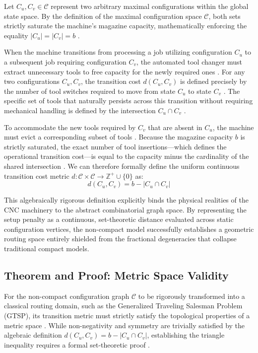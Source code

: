 \documentclass[11pt, a4paper]{book}
\begin{document}
	Let $C_u, C_v \in \mathcal{C}$ represent two arbitrary maximal configurations within the global state space. By the definition of the maximal configuration space $\mathcal{C}$, both sets strictly saturate the machine's magazine capacity, mathematically enforcing the equality $|C_u| = |C_v| = b$ \cite{Colares2026}. %
	
	When the machine transitions from processing a job utilizing configuration $C_u$ to a subsequent job requiring configuration $C_v$, the automated tool changer must extract unnecessary tools to free capacity for the newly required ones \cite{Colares2026}. %
	For any two configurations $C_u, C_v$, the transition cost $d(C_u, C_v)$ is defined precisely by the number of tool switches required to move from state $C_u$ to state $C_v$ \cite{Colares2026}. %
	The specific set of tools that naturally persists across this transition without requiring mechanical handling is defined by the intersection $C_u \cap C_v$ \cite{Colares2026}. %
	
	To accommodate the new tools required by $C_v$ that are absent in $C_u$, the machine must evict a corresponding subset of tools \cite{Colares2026}. %
	Because the magazine capacity $b$ is strictly saturated, the exact number of tool insertions—which defines the operational transition cost—is equal to the capacity minus the cardinality of the shared intersection \cite{Colares2026}. %
	We can therefore formally define the uniform continuous transition cost metric $d: \mathcal{C} \times \mathcal{C} \to \mathbb{Z}^+ \cup \{0\}$ as:
	\begin{equation}
		d(C_u, C_v) = b - |C_u \cap C_v| \label{eq:transition_metric}
	\end{equation}
	
	This algebraically rigorous definition explicitly binds the physical realities of the CNC machinery to the abstract combinatorial graph space. By representing the setup penalty as a continuous, set-theoretic distance evaluated across static configuration vertices, the non-compact model successfully establishes a geometric routing space entirely shielded from the fractional degeneracies that collapse traditional compact models.
	
	\subsection{Theorem and Proof: Metric Space Validity}
	
	For the non-compact configuration graph $\mathcal{C}$ to be rigorously transformed into a classical routing domain, such as the Generalized Traveling Salesman Problem (GTSP), its transition metric must strictly satisfy the topological properties of a metric space \cite{Colares2026}. %
	While non-negativity and symmetry are trivially satisfied by the algebraic definition $d(C_u, C_v) = b - |C_u \cap C_v|$, establishing the triangle inequality requires a formal set-theoretic proof \cite{Colares2026}. %
	
\end{document}
